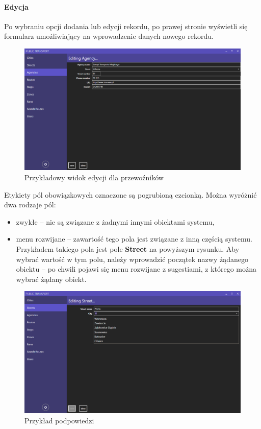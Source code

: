 \documentclass[10pt,a4paper]{article}
\begin{document}
\paragraph{Edycja}
Po wybraniu opcji dodania lub edycji rekordu, po prawej stronie wyświetli się formularz umożliwiający na wprowadzenie danych nowego rekordu.
\begin{figure}[H]
	\centering
	\includegraphics[width=15cm]{Resources/Images/08_edit_agency.png}
	\caption{Przykładowy widok edycji dla przewoźników}
\end{figure}
Etykiety pól obowiązkowych oznaczone są pogrubioną czcionką. Można wyróżnić dwa rodzaje pól:
\begin{itemize}
	\item zwykłe -- nie są związane z żadnymi innymi obiektami systemu,
	\item menu rozwijane -- zawartość tego pola jest związane z inną częścią systemu. Przykładem takiego pola jest pole \textbf{Street} na powyższym rysunku. Aby wybrać wartość w tym polu, należy wprowadzić początek nazwy żądanego obiektu -- po chwili pojawi się menu rozwijane z sugestiami, z którego można wybrać żądany obiekt.
\end{itemize}
\begin{figure}[H]
	\centering
	\includegraphics[width=15cm]{Resources/Images/06_edit_street.png}
	\caption{Przykład podpowiedzi}
\end{figure}
\end{document}
